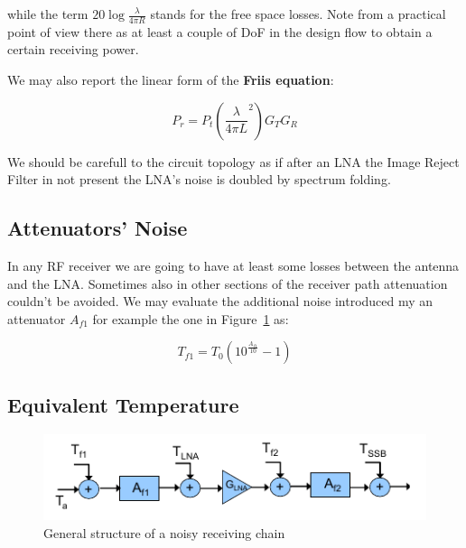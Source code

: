 while the term $20\log{ \frac{\lambda}{4 \pi R} }$ stands for the free space losses.
Note from a practical point of view there as at least a couple of DoF in the design flow to obtain a certain receiving power.

We may also report the linear form of the \textbf{Friis equation}:

\begin{equation}
P_r = P_t  \left( \frac { \lambda } {4 \pi L}^2 \right) G_T G_R
\end{equation}

We should be carefull to the circuit topology as if after an LNA the Image Reject Filter in not present the LNA's noise is doubled by spectrum folding.



\subsection{Attenuators' Noise} %
\label{sub:noise_of_attenuators}

In any RF receiver we are going to have at least some losses between the antenna and the LNA. Sometimes also in other sections of the receiver path attenuation couldn't be avoided.
We may evaluate the additional noise introduced my an attenuator $A_{f1}$ for example the one in Figure~\ref{fig:Teq} as:

\begin{equation}
	T_{f1} = T_0 (10^{ \frac {A_{f1}} {10} }-1)
\end{equation}




\subsection{Equivalent Temperature} %
\label{sub:equivalent_temperature}

\begin{figure} [h!]
	\centering
	\includegraphics[scale=1]{Immagini/Teq}
	
	\caption{General structure of a noisy receiving chain}
	\label{fig:Teq}
\end{figure}


